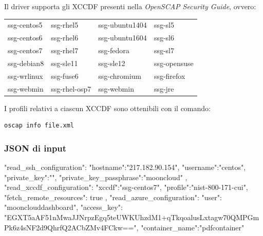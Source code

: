 \documentclass[../main.tex]{subfiles}
\begin{document}
Il driver supporta gli XCCDF presenti nella \textit{OpenSCAP Security Guide}, ovvero:
\begin{table}[H]
    \begin{tabulary}{\textwidth}{xxxx}

         
        ssg-centos5 & ssg-rhel5     & ssg-ubuntu1404 & ssg-sl5      \\
        ssg-centos6 & ssg-rhel6     & ssg-ubuntu1604 & ssg-sl6      \\
        ssg-centos7 & ssg-rhel7     & ssg-fedora     & ssg-sl7      \\
        ssg-debian8 & ssg-sle11     & ssg-sle12      & ssg-opensuse \\
        ssg-wrlinux & ssg-fuse6     & ssg-chromium   & ssg-firefox  \\
        ssg-webmin  & ssg-rhel-osp7 & ssg-webmin     & ssg-jre

    \end{tabulary}
\end{table}
I profili relativi a ciascun XCCDF sono ottenibili con il comando:
\begin{Verbatim}[H, frame=single]
oscap info file.xml
\end{Verbatim}
\subsubsection{JSON di input}
\begin{javascript}
{
    "read_ssh_configuration": {
        "hostname":"217.182.90.154",
        "username":"centos",
        "private_key":"",
        "private_key_passphrase":"mooncloud"
    },
    "read_xccdf_configuration": {
        "xccdf":"ssg-centos7",
        "profile":"nist-800-171-cui",
        "fetch_remote_resources": true
    },
    "read_azure_configuration": {
        "user": "moonclouddashboard",
        "access_key": "EGXT5aAF51nMwaJJNrpzEgq5teUWKUhzdM1+qTkqoalusLxtagw70QMPGmPk6z4sNF2d9QhrfQ2ACbZMv4FCkw==",
        "container_name":"pdfcontainer"
    }
}

\end{javascript}
\end{document}
